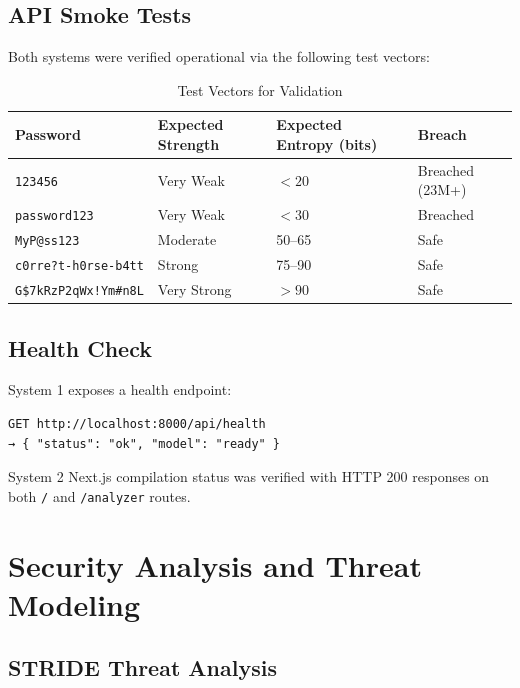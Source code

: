 \documentclass[12pt,a4paper]{article}
\begin{document}
\subsection{API Smoke Tests}

Both systems were verified operational via the following test vectors:

\begin{table}[H]
\centering
\begin{tabular}{lp{3cm}lp{3cm}}
\toprule
\textbf{Password} & \textbf{Expected Strength} & \textbf{Expected Entropy (bits)} & \textbf{Breach} \\
\midrule
\texttt{123456}         & Very Weak   & $< 20$  & Breached (23M+) \\
\texttt{password123}    & Very Weak   & $< 30$  & Breached \\
\texttt{MyP@ss123}      & Moderate    & 50--65  & Safe \\
\texttt{c0rre?t-h0rse-b4tt} & Strong & 75--90  & Safe \\
\texttt{G\$7kRzP2qWx!Ym\#n8L} & Very Strong & $>90$ & Safe \\
\bottomrule
\end{tabular}
\caption{Test Vectors for Validation}
\end{table}

\subsection{Health Check}

System 1 exposes a health endpoint:

\begin{verbatim}
GET http://localhost:8000/api/health
→ { "status": "ok", "model": "ready" }
\end{verbatim}

System 2 Next.js compilation status was verified with HTTP 200 responses
on both \texttt{/} and \texttt{/analyzer} routes.

\section{Security Analysis and Threat Modeling}

\subsection{STRIDE Threat Analysis}
\end{document}
